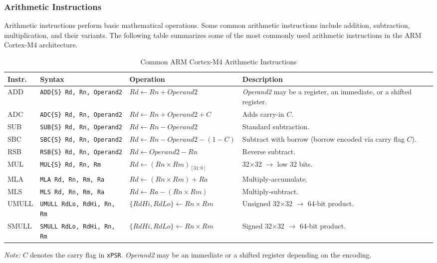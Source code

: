 \subsubsection{Arithmetic Instructions}
Arithmetic instructions perform basic mathematical operations. Some common arithmetic instructions include addition, subtraction, multiplication, and their variants. The following table summarizes some of the most commonly used arithmetic instructions in the ARM Cortex-M4 architecture.
\begin{table}[H]
\centering
\caption{Common ARM Cortex-M4 Arithmetic Instructions}
\small
\begin{tabularx}{\linewidth}{@{}l l l X@{}}
\toprule
\textbf{Instr.} & \textbf{Syntax} & \textbf{Operation} & \textbf{Description} \\
\midrule
ADD  & \texttt{ADD\{S\} Rd, Rn, Operand2}
     & $Rd \leftarrow Rn + Operand2$
     & \emph{Operand2} may be a register, an immediate, or a shifted register. \\
ADC  & \texttt{ADC\{S\} Rd, Rn, Operand2}
     & $Rd \leftarrow Rn + Operand2 + C$
     & Adds carry-in $C$. \\
SUB  & \texttt{SUB\{S\} Rd, Rn, Operand2}
     & $Rd \leftarrow Rn - Operand2$
     & Standard subtraction. \\
SBC  & \texttt{SBC\{S\} Rd, Rn, Operand2}
     & $Rd \leftarrow Rn - Operand2 - (1 - C)$
     & Subtract with borrow (borrow encoded via carry flag $C$). \\
RSB  & \texttt{RSB\{S\} Rd, Rn, Operand2}
     & $Rd \leftarrow Operand2 - Rn$
     & Reverse subtract. \\
MUL  & \texttt{MUL\{S\} Rd, Rn, Rm}
     & $Rd \leftarrow (Rn \times Rm)_{[31{:}0]}$
     & 32$\times$32 $\rightarrow$ low 32 bits. \\
MLA  & \texttt{MLA Rd, Rn, Rm, Ra}
     & $Rd \leftarrow (Rn \times Rm) + Ra$
     & Multiply-accumulate. \\
MLS  & \texttt{MLS Rd, Rn, Rm, Ra}
     & $Rd \leftarrow Ra - (Rn \times Rm)$
     & Multiply-subtract. \\
UMULL & \texttt{UMULL RdLo, RdHi, Rn, Rm}
      & $\{RdHi,RdLo\} \leftarrow Rn \times Rm$
      & Unsigned 32$\times$32 $\rightarrow$ 64-bit product. \\
SMULL & \texttt{SMULL RdLo, RdHi, Rn, Rm}
      & $\{RdHi,RdLo\} \leftarrow Rn \times Rm$
      & Signed 32$\times$32 $\rightarrow$ 64-bit product. \\
\bottomrule
\end{tabularx}

\vspace{2pt}
\footnotesize\emph{Note:} $C$ denotes the carry flag in \texttt{xPSR}. \emph{Operand2} may be an immediate or a shifted register depending on the encoding.
\end{table}
